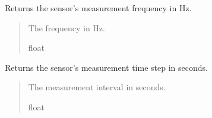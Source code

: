 \documentclass[letterpaper,10pt,english]{sphinxmanual}
\begin{document}
\begin{fulllineitems}

\begin{fulllineitems}
\label{\detokenize{modules/measurement/sensor:qnav.measurement.sensor.Sensor.frequency}}
\pysigstartsignatures
{}
\pysigstopsignatures
\sphinxAtStartPar
Returns the sensor’s measurement frequency in Hz.
\begin{quote}\begin{description}
\sphinxAtStartPar
The frequency in Hz.

\sphinxAtStartPar
float

\end{description}\end{quote}

\end{fulllineitems}


\begin{fulllineitems}
\label{\detokenize{modules/measurement/sensor:qnav.measurement.sensor.Sensor.time_step}}
\pysigstartsignatures
{}
\pysigstopsignatures
\sphinxAtStartPar
Returns the sensor’s measurement time step in seconds.
\begin{quote}\begin{description}
\sphinxAtStartPar
The measurement interval in seconds.

\sphinxAtStartPar
float

\end{description}\end{quote}

\end{fulllineitems}


\end{fulllineitems}

\end{document}
